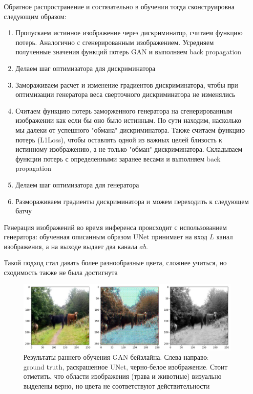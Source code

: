 \documentclass[14pt]{article}
\begin{document}
Обратное распространение и состязательно в обучении тогда сконструировна следующим образом:
\begin{enumerate}
    \item Пропускаем истинное изображение через дискриминатор, считаем функцию потерь. Аналогично с сгенерированным изображением.
    Усредняем полученные значения функций потерь GAN и выполняем back propagation
    \item Делаем шаг оптимизатора для дискриминатора
    \item Замораживаем расчет и изменение градиентов дискриминатора, чтобы при оптимизации генератора веса сверточного дискриминатора не изменялись
    \item Считаем функцию потерь заморженного генератора на сгенерированным изображении как если бы оно было истинным. По сути
    находим, насколько мы далеки от успешного "обмана" дискриминатора. Также считаем функцию потерь (L1Loss), чтобы оставлять одной из важных целей
    близость к истинному изображению, а не только "обман" дискриминатора. 
    Складываем функции потерь с определенными заранее весами и выполняем back propagation
    \item Делаем шаг оптимизатора для генератора
    \item Размораживаем градиенты дискриминатора и можем переходить к следующем батчу
\end{enumerate}

Генерация изображений во время инференса происходит с использованием генератора: обученная описанным образом UNet принимает на вход
$L$ канал изображения, а на выходе выдает два канала $ab$.

Такой подход стал давать более разнообразные цвета, сложнее учиться, но сходимость также не была достигнута

\begin{figure}[H]
    \centering
    \includegraphics[width=1.0\textwidth]{resources/middle_of_gan_baseline.png}
    \caption{Результаты раннего обучения GAN бейзлайна. Слева направо: ground truth, раскрашенное UNet, черно-белое изображение. Стоит отметить,
    что области изображения (трава и животные) визуально выделены верно, но цвета не соответствуют действительности}
    \label{fig:id_figura}
\end{figure}
\end{document}
